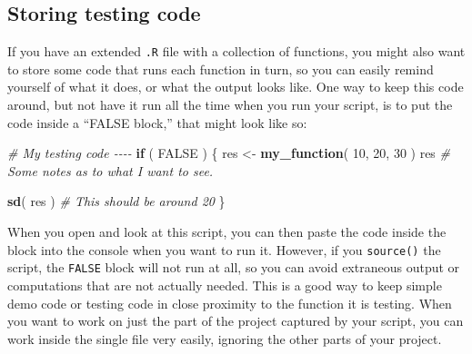 \documentclass[
]{book}
\newenvironment{Shaded}{\begin{snugshade}}{\end{snugshade}}
\newcommand{\CommentTok}[1]{\textcolor[rgb]{0.56,0.35,0.01}{\textit{#1}}}
\newcommand{\ConstantTok}[1]{\textcolor[rgb]{0.56,0.35,0.01}{#1}}
\newcommand{\ControlFlowTok}[1]{\textcolor[rgb]{0.13,0.29,0.53}{\textbf{#1}}}
\newcommand{\DecValTok}[1]{\textcolor[rgb]{0.00,0.00,0.81}{#1}}
\newcommand{\FunctionTok}[1]{\textcolor[rgb]{0.13,0.29,0.53}{\textbf{#1}}}
\newcommand{\NormalTok}[1]{#1}
\newcommand{\OtherTok}[1]{\textcolor[rgb]{0.56,0.35,0.01}{#1}}
\begin{document}
\subsection{Storing testing code}\label{storing-testing-code}

If you have an extended \texttt{.R} file with a collection of functions, you might also want to store some code that runs each function in turn, so you can easily remind yourself of what it does, or what the output looks like.
One way to keep this code around, but not have it run all the time when you run your script, is to put the code inside a ``FALSE block,'' that might look like so:

\begin{Shaded}
\begin{Highlighting}[]
\CommentTok{\# My testing code {-}{-}{-}{-}}
\ControlFlowTok{if}\NormalTok{ ( }\ConstantTok{FALSE}\NormalTok{ ) \{}
\NormalTok{  res }\OtherTok{\textless{}{-}} \FunctionTok{my\_function}\NormalTok{( }\DecValTok{10}\NormalTok{, }\DecValTok{20}\NormalTok{, }\DecValTok{30}\NormalTok{ )}
\NormalTok{  res}
  \CommentTok{\# Some notes as to what I want to see.}
  
  \FunctionTok{sd}\NormalTok{( res )}
  \CommentTok{\# This should be around 20}
\NormalTok{\}}
\end{Highlighting}
\end{Shaded}

When you open and look at this script, you can then paste the code inside the block into the console when you want to run it.
However, if you \texttt{source()} the script, the \texttt{FALSE} block will not run at all, so you can avoid extraneous output or computations that are not actually needed.
This is a good way to keep simple demo code or testing code in close proximity to the function it is testing.
When you want to work on just the part of the project captured by your script, you can work inside the single file very easily, ignoring the other parts of your project.
\end{document}
